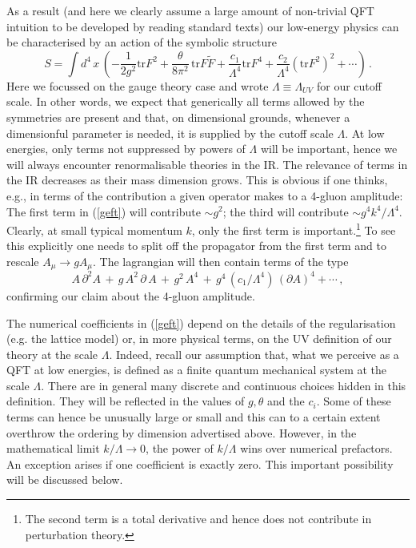 \documentclass[12pt]{article}
\newcommand{\be}{\begin{equation}}
\newcommand{\ee}{\end{equation}}
\numberwithin{equation}{section}
\begin{document}
As a result (and here we clearly assume a large amount of non-trivial QFT intuition to be developed by reading standard texts) our low-energy physics can be characterised by an action of the symbolic structure 
\be
S=\int d^4\,x\,\left(-\frac{1}{2g^2}\mbox{tr}F^2+\frac{\theta}{8\pi^2}\, \mbox{tr}F\tilde{F} +\frac{c_1}{\Lambda^4}\mbox{tr}F^4 +\frac{c_2}{\Lambda^4}(\mbox{tr}F^2)^2+\cdots\right)\,.\label{geft}
\ee
Here we focussed on the gauge theory case and wrote $\Lambda\equiv \Lambda_{UV}$ for our cutoff scale. In other words, we expect that generically all terms allowed by the symmetries are present and that, on dimensional grounds, whenever a dimensionful parameter is needed, it is supplied by the cutoff scale $\Lambda$. At low energies, only terms not suppressed by powers of $\Lambda$ will be important, hence we will always encounter renormalisable theories in the IR. The relevance of terms in the IR decreases as their mass dimension  grows. This is obvious if one thinks, e.g., in terms of the contribution a given operator makes to a 4-gluon amplitude: The first term in (\ref{geft}) will contribute $\sim g^2$; the third will contribute $\sim g^4k^4/\Lambda^4$. Clearly, at small typical momentum $k$, only the first term is important.\footnote{The 
second term is a total derivative and hence does not contribute in perturbation theory.
} 
To see this explicitly one needs to split off the propagator from the first term and to rescale $A_\mu\to gA_\mu$. The lagrangian will then contain terms of the type
\be
A\,\partial^2 A\,+\,g\, A^2\,\partial\,A\,+\,g^2\,A^4\,+\,g^4\,(c_1/\Lambda^4)\,(\partial A)^4+\cdots\,,
\ee
confirming our claim about the 4-gluon amplitude.

The numerical coefficients in (\ref{geft}) depend on the details of the regularisation (e.g. the lattice model) or, in more physical terms, on the UV definition of our theory at the scale $\Lambda$. Indeed, recall our assumption that, what we perceive as a QFT at low energies, is defined as a finite quantum mechanical system at the scale $\Lambda$. There are in general many discrete and continuous choices hidden in this definition. They will be reflected in the values of $g,\theta$ and the $c_i$. Some of these terms can hence be unusually large or small and this can to a certain extent overthrow the ordering by dimension advertised above. However, in the mathematical limit $k/\Lambda\to 0$, the power of $k/\Lambda$ wins over numerical prefactors. An exception arises if one coefficient is exactly zero. This  important possibility will be discussed below.
\end{document}
